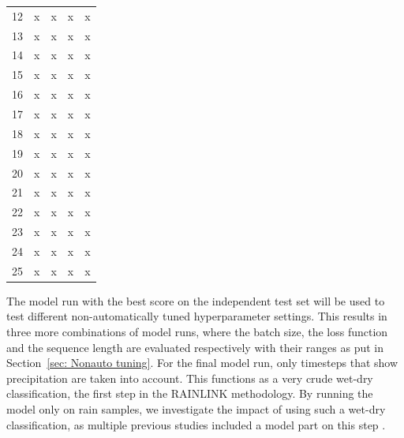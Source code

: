 \documentclass[twocolumn, 10pt, a4paper]{memoir}
\begin{document}
\begin{table}[t]
\begin{tabular}{P{0.4cm}P{1.2cm}P{1.2cm}P{1.4cm}P{1.2cm}}
			12                           & x           & x             & x                & x                \\
			13                           & x           & x             & x                & x                \\
			14                           & x           & x             & x                & x                \\
			15                           & x           & x             & x                & x                \\
			16                           & x           & x             & x                & x                \\
			17                           & x           & x             & x                & x                \\
			18                           & x           & x             & x                & x                \\
			19                           & x           & x             & x                & x                \\
			20                           & x           & x             & x                & x                \\
			21                           & x           & x             & x                & x                \\
			22                           & x           & x             & x                & x                \\
			23                           & x           & x             & x                & x                \\
			24                           & x           & x             & x                & x                \\
			25                           & x           & x             & x                & x                
		\end{tabular}
		
	\end{table}
	The model run with the best score on the independent test set will be used to test different non-automatically tuned hyperparameter settings. This results in three more combinations of model runs, where the batch size, the loss function and the sequence length are evaluated respectively with their ranges as put in Section~\ref{sec: Nonauto tuning}.
	For the final model run, only timesteps that show precipitation are taken into account. This functions as a very crude wet-dry classification, the first step in the RAINLINK methodology. By running the model only on rain samples, we investigate the impact of using such a wet-dry classification, as multiple previous studies included a model part on this step \cite{Habi2019}.
\end{document}
